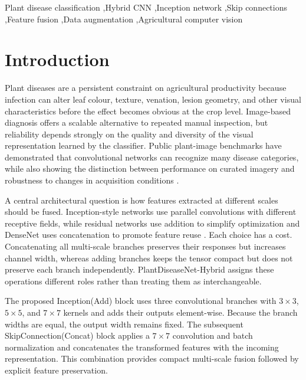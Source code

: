 \documentclass[a4paper,fleqn]{cas-dc}
\begin{document}
\begin{keywords}
Plant disease classification \sep Hybrid CNN \sep Inception network \sep Skip connections \sep Feature fusion \sep Data augmentation \sep Agricultural computer vision
\end{keywords}
\maketitle

\section{Introduction}
Plant diseases are a persistent constraint on agricultural productivity because infection can alter leaf colour, texture, venation, lesion geometry, and other visual characteristics before the effect becomes obvious at the crop level. Image-based diagnosis offers a scalable alternative to repeated manual inspection, but reliability depends strongly on the quality and diversity of the visual representation learned by the classifier. Public plant-image benchmarks have demonstrated that convolutional networks can recognize many disease categories, while also showing the distinction between performance on curated imagery and robustness to changes in acquisition conditions \citep{mohanty2016using,sladojevic2016deep}.

A central architectural question is how features extracted at different scales should be fused. Inception-style networks use parallel convolutions with different receptive fields, while residual networks use addition to simplify optimization and DenseNet uses concatenation to promote feature reuse \citep{szegedy2015going,he2016deep,huang2017densely}. Each choice has a cost. Concatenating all multi-scale branches preserves their responses but increases channel width, whereas adding branches keeps the tensor compact but does not preserve each branch independently. PlantDiseaseNet-Hybrid assigns these operations different roles rather than treating them as interchangeable.

The proposed Inception(Add) block uses three convolutional branches with $3\times3$, $5\times5$, and $7\times7$ kernels and adds their outputs element-wise. Because the branch widths are equal, the output width remains fixed. The subsequent SkipConnection(Concat) block applies a $7\times7$ convolution and batch normalization and concatenates the transformed features with the incoming representation. This combination provides compact multi-scale fusion followed by explicit feature preservation.
\end{document}
